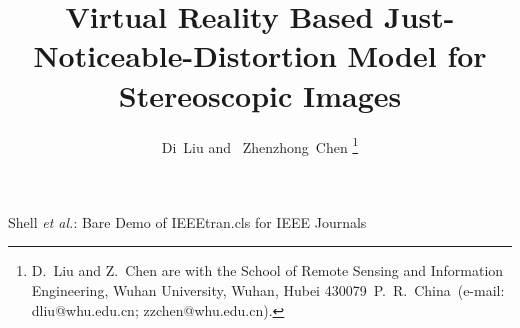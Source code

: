 \documentclass[journal]{IEEEtran}
\begin{document}
%
\title{Virtual Reality Based Just-Noticeable-Distortion Model for Stereoscopic Images}
%
%
%

\author{Di~Liu and ~Zhenzhong~Chen%
\thanks{D.~Liu and Z.~Chen are with the School of Remote Sensing and Information Engineering, Wuhan University, Wuhan, Hubei 430079~P.~R.~China~(e-mail: dliu@whu.edu.cn; zzchen@whu.edu.cn).}%
}

%
%



%
{Shell \MakeLowercase{\textit{et al.}}: Bare Demo of IEEEtran.cls for IEEE Journals}
%
\end{document}
